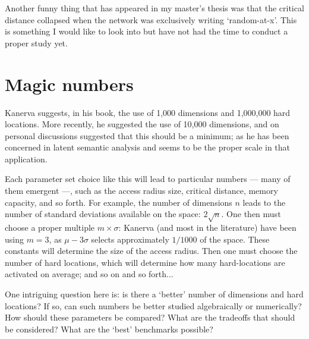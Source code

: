 Another funny thing that has appeared in my master's thesis was that the critical distance collapsed when the network was exclusively writing `random-at-x'.  This is something I would like to look into but have not had the time to conduct a proper study yet.

\section{Magic numbers}

Kanerva suggests, in his book, the use of 1,000 dimensions and 1,000,000 hard locations.  More recently, he suggested the use of 10,000 dimensions, and on personal discussions suggested that this should be a minimum; as he has been concerned in latent semantic analysis and seems to be the proper scale in that application.

Each parameter set choice like this will lead to particular numbers --- many of them emergent ---, such as the access radius size, critical distance, memory capacity, and so forth.  For example, the number of dimensions $n$ leads to the number of standard deviations available on the space: $2 \sqrt{n}$.  One then must choose a proper multiple $m\times\sigma$: Kanerva (and most in the literature) have been using $m=3$, as $\mu-3\sigma$ selects approximately $1/1000$ of the space. These constants will determine the size of the access radius.  Then one must choose the number of hard locations, which will determine how many hard-locations are activated on average; and so on and so forth...

One intriguing question here is:  is there a `better' number of dimensions and hard locations?  If so, can such numbers be better studied algebraically or numerically? How should these parameters be compared?  What are the tradeoffs that should be considered?  What are the `best' benchmarks possible?






